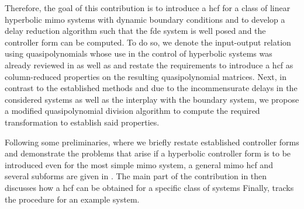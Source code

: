 Therefore, the goal of this contribution is to introduce a \gls{hcf} for a class
of linear hyperbolic \acs{mimo} systems with dynamic boundary conditions and to
develop a delay reduction algorithm such that the \gls{fde} system is well
posed and the controller form can be computed.
To do so, we denote the input-output relation using quasipolynomials whose use
in the control of hyperbolic systems was already reviewed in \cite{Loiseau1998}
as well as \cite{Benarab2022} and restate the requirements to introduce a \gls{hcf}
as column-reduced properties on the resulting quasipolynomial matrices.
Next, in contrast to the established methods and due to the incommensurate
delays in the considered systems as well as the interplay with the boundary
system, we propose a modified quasipolynomial division algorithm to compute
the required transformation to establish said properties. 





Following some preliminaries, where we briefly restate established controller 
forms and demonstrate the problems that arise if a hyperbolic controller form
is to be introduced even for the most simple \acs{mimo} system,
a general \acs{mimo} \gls{hcf} and several subforms are given in .
The main part of the contribution in  then discusses
how a \gls{hcf} can be obtained for a specific class of systems 
Finally,  tracks the procedure for an example system.


